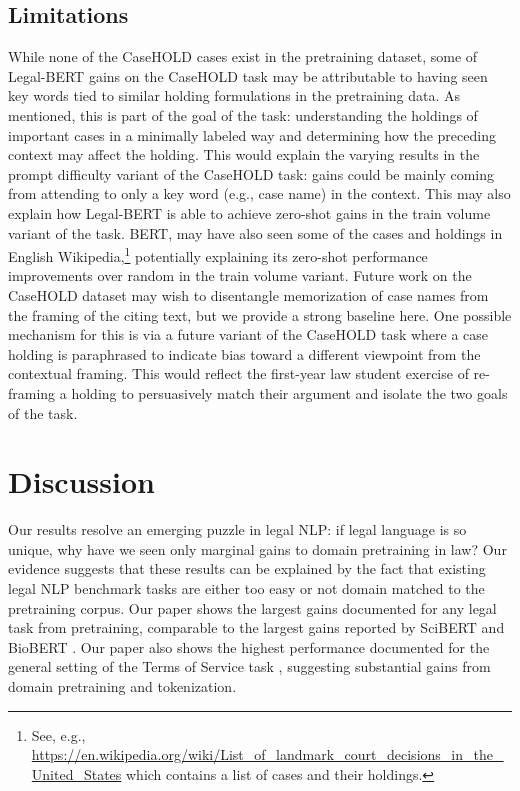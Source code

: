 \documentclass[sigconf]{acmart}
\begin{document}
\subsection{Limitations}
While none of the CaseHOLD cases exist in the pretraining dataset, some of Legal-BERT gains on the CaseHOLD task may be attributable to having seen key words tied to similar holding formulations in the pretraining data. As mentioned, this is part of the goal of the task: understanding the holdings of important cases in a minimally labeled way and determining how the preceding context may affect the holding. This would explain the varying results in the prompt difficulty variant of the CaseHOLD task: gains could be mainly coming from attending to only a key word (e.g., case name) in the context. This may also explain how Legal-BERT is able to achieve zero-shot gains in the train volume variant of the task. 
BERT, may have also seen some of the cases and holdings in English Wikipedia,\footnote{See, e.g., \url{https://en.wikipedia.org/wiki/List_of_landmark_court_decisions_in_the_United_States} which contains a list of cases and their holdings.} potentially explaining its zero-shot performance improvements over random in the train volume variant.
Future work on the CaseHOLD dataset may wish to disentangle memorization of case names from the framing of the citing text, but we provide a strong baseline here. One possible mechanism for this is via a future variant of the CaseHOLD task where a case holding is paraphrased to indicate bias toward a different viewpoint from the contextual framing. This would reflect the first-year law student exercise of re-framing a holding to persuasively match their argument and isolate the two goals of the task.

\balance
\section{Discussion}
Our results resolve an emerging puzzle in legal NLP: if legal language is so unique, why have we seen only marginal gains to domain pretraining in law?  Our evidence suggests that these results can be explained by the fact that existing legal NLP benchmark tasks are either too easy or not domain matched to the pretraining corpus.  Our paper shows the largest gains documented for any legal task from pretraining, comparable to the largest gains reported by SciBERT and BioBERT \cite{beltagy-etal-2019-scibert, lee_biobert_2019}. Our paper also shows the highest performance documented for the general setting of the Terms of Service task \cite{Lippi_2019}, suggesting substantial gains from domain pretraining and tokenization.
\end{document}

